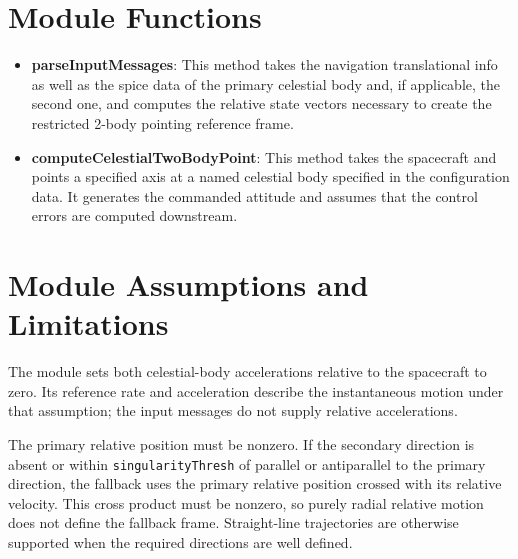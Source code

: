 

\section{Module Functions}
\begin{itemize}
	\item \textbf{parseInputMessages}: This method takes the navigation translational info as well as the spice data of the primary celestial body and, if applicable, the second one, and computes the relative state vectors necessary to create the restricted 2-body pointing reference frame.
	\item \textbf{computeCelestialTwoBodyPoint}: This method takes the spacecraft and points a specified axis at a named
 celestial body specified in the configuration data.  It generates the commanded attitude and assumes that the control errors are computed downstream.
 \end{itemize}

\section{Module Assumptions and Limitations}

The module sets both celestial-body accelerations relative to the spacecraft to zero. Its reference rate and acceleration describe the instantaneous motion under that assumption; the input messages do not supply relative accelerations.

The primary relative position must be nonzero. If the secondary direction is absent or within \texttt{singularityThresh} of parallel or antiparallel to the primary direction, the fallback uses the primary relative position crossed with its relative velocity. This cross product must be nonzero, so purely radial relative motion does not define the fallback frame. Straight-line trajectories are otherwise supported when the required directions are well defined.

